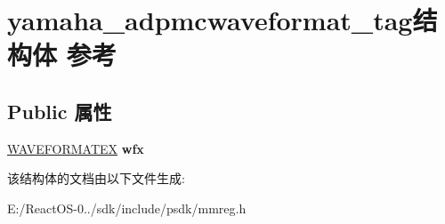 \hypertarget{structyamaha__adpmcwaveformat__tag}{}\section{yamaha\+\_\+adpmcwaveformat\+\_\+tag结构体 参考}
\label{structyamaha__adpmcwaveformat__tag}
\subsection*{Public 属性}
\begin{DoxyCompactItemize}
\item 
\mbox{\label{structyamaha__adpmcwaveformat__tag_a23103bdfbb89d42ce5ffce8762b885fd}} 
\hyperlink{struct_w_a_v_e_f_o_r_m_a_t_e_x}{W\+A\+V\+E\+F\+O\+R\+M\+A\+T\+EX} {\bfseries wfx}
\end{DoxyCompactItemize}


该结构体的文档由以下文件生成\+:\begin{DoxyCompactItemize}
\item 
E\+:/\+React\+O\+S-\/0../sdk/include/psdk/mmreg.\+h\end{DoxyCompactItemize}
